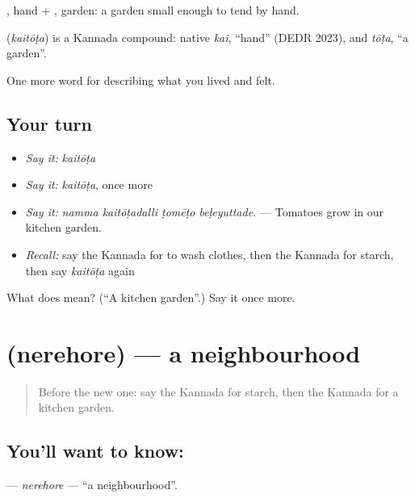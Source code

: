 , hand + , garden: a garden small enough to tend by hand.

\begin{cousinweb}
\textbf{} (\emph{kaitōṭa}) is a Kannada compound: native \emph{kai}, \textquotedblleft{}hand\textquotedblright{} (DEDR 2023), and \emph{tōṭa}, \textquotedblleft{}a garden\textquotedblright{}.
\end{cousinweb}

\begin{grammarlens}[title={What you've built}]
One more word for describing what you lived and felt.
\end{grammarlens}

\subsection*{Your turn}
\begin{itemize}
\raggedright
  \item \emph{Say it:} \emph{kaitōṭa}
  \item \emph{Say it:} \emph{kaitōṭa}, once more
  \item \emph{Say it:} \emph{namma kaitōṭadalli ṭomēṭo beḷeyuttade.} — Tomatoes grow in our kitchen garden.
  \item \emph{Recall:} say the Kannada for to wash clothes, then the Kannada for starch, then say \emph{kaitōṭa} again
\end{itemize}

\begin{tcolorbox}[breakable,colback=teal!4,colframe=teal!35!black,title={Before you move on}]
What does  mean? (\textquotedblleft{}A kitchen garden\textquotedblright{}.) Say it once more.
\end{tcolorbox}
\section[\texorpdfstring{\kn{ನೆರೆಹೊರೆ} (nerehore)}{ನೆರೆಹೊರೆ (nerehore)}]{ (nerehore) — a neighbourhood}

\label{lesson:KA-C546-nerehore}



\begin{quote}
Before the new one: say the Kannada for starch, then the Kannada for a kitchen garden.
\end{quote}

\subsection*{You'll want to know: }
\textbf{} — \emph{nerehore} — \textquotedblleft{}a neighbourhood\textquotedblright{}.

